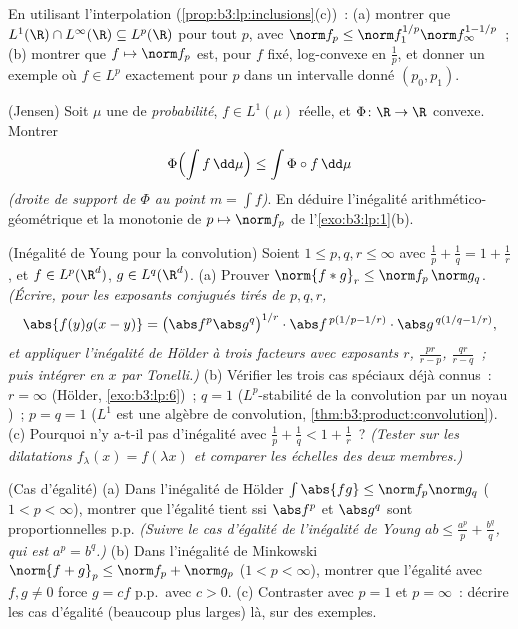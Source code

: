 \begin{exercise}[$\star\star$]\label{exo:b3:lp:9}
En utilisant l'interpolation (\cref{prop:b3:lp:inclusions}(c))~:
(a) montrer que $L^1(\R)\cap L^\infty(\R) \subseteq L^p(\R)$
pour tout $p$, avec $\norm f_p \leq \norm f_1^{1/p}\norm
f_\infty^{1 - 1/p}$~;
(b) montrer que $f \mapsto \norm f_p$ est, pour $f$ fixé,
log-convexe en $\frac1p$, et donner un exemple où $f \in L^p$
exactement pour $p$ dans un intervalle donné $(p_0, p_1)$.
\end{exercise}

\begin{exercise}[$\star\star$]\label{exo:b3:lp:10}
(Jensen) Soit $\mu$ une  de \emph{probabilité}, $f \in
L^1(\mu)$ réelle, et $\Phi \colon \R \to \R$ convexe. Montrer
\[
\Phi\Bigl(\int f\,\dd\mu\Bigr) \leq \int \Phi\circ
f\,\dd\mu
\]
\emph{(droite de support de $\Phi$ au point $m = \int f$)}.
En déduire l'inégalité arithmético-géométrique et la
monotonie de $p \mapsto \norm f_p$ de
l'\cref{exo:b3:lp:1}(b).
\end{exercise}

\begin{exercise}[$\star\star\star$]\label{exo:b3:lp:11}
(Inégalité de Young pour la convolution) Soient $1 \leq p, q,
r \leq \infty$ avec $\frac1p + \frac1q = 1 + \frac1r$, et $f
\in L^p(\R^d)$, $g \in L^q(\R^d)$.
(a) Prouver $\norm{f * g}_r \leq \norm f_p\,\norm g_q$.
\emph{(Écrire, pour les exposants conjugués tirés de $p, q,
r$,
\[
\abs{f(y)g(x-y)} = \bigl(\abs f^p\abs g^q\bigr)^{1/r}
\cdot\abs f^{\,p(1/p - 1/r)}\cdot\abs g^{\,q(1/q - 1/r)},
\]
et appliquer l'inégalité de Hölder à trois facteurs avec
exposants $r$, $\frac{pr}{r - p}$, $\frac{qr}{r - q}$~; puis
intégrer en $x$ par Tonelli.)}
(b) Vérifier les trois cas spéciaux déjà connus~: $r =
\infty$ (Hölder, \cref{exo:b3:lp:6})~; $q = 1$
($L^p$-stabilité de la convolution par un noyau
)~; $p = q = 1$ ($L^1$ est une algèbre de
convolution, \cref{thm:b3:product:convolution}).
(c) Pourquoi n'y a-t-il pas d'inégalité avec $\frac1p +
\frac1q < 1 + \frac1r$~? \emph{(Tester sur les dilatations
$f_\lambda(x) = f(\lambda x)$ et comparer les échelles des
deux membres.)}
\end{exercise}

\begin{exercise}[$\star\star$]\label{exo:b3:lp:12}
(Cas d'égalité) (a) Dans l'inégalité de Hölder
$\int\abs{fg} \leq \norm f_p\norm g_q$ ($1 < p < \infty$),
montrer que l'égalité tient ssi $\abs f^p$ et $\abs g^q$ sont
proportionnelles p.p. \emph{(Suivre le cas d'égalité de
l'inégalité de Young $ab \leq \frac{a^p}p + \frac{b^q}q$,
qui est $a^p = b^q$.)}
(b) Dans l'inégalité de Minkowski $\norm{f + g}_p \leq \norm
f_p + \norm g_p$ ($1 < p < \infty$), montrer que l'égalité
avec $f, g \neq 0$ force $g = cf$ p.p.\ avec $c > 0$.
(c) Contraster avec $p = 1$ et $p = \infty$~: décrire les
cas d'égalité (beaucoup plus larges) là, sur des exemples.
\end{exercise}

